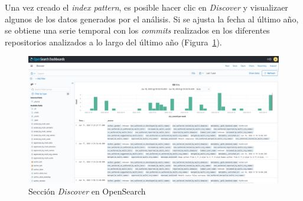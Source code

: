Una vez creado el \emph{index pattern}, es posible hacer clic en \emph{Discover} y visualizaer algunos de los datos generados por el análisis. Si se ajusta la fecha al último año, se obtiene una serie temporal con los \emph{commits} realizados en los diferentes repositorios analizados a lo largo del último año (Figura~\ref{fig:opensearch-discover}).

\begin{figure}[ht]
    \centering
    \includegraphics[width=\textwidth]{Figures/opensearch-discover.png}
    \decoRule
    \caption[OpenSearch (Sección \emph{Discover})]{Sección \emph{Discover} en OpenSearch}
    \label{fig:opensearch-discover}
\end{figure}
